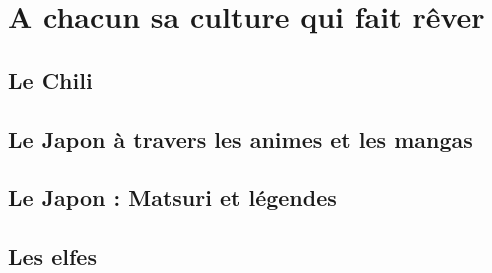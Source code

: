 \part{A chacun sa culture qui fait rêver}
\chapter{Le Chili}

\chapter{Le Japon à travers les animes et les mangas}

\chapter{Le Japon : Matsuri et légendes}

\chapter{Les elfes}